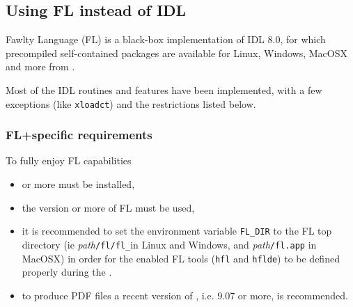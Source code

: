 \documentclass[12pt,twoside]{article}
\makeatletter
\newcommand{\nop}[1]{\Hy@raisedlink{\hypertarget{#1}{}}}
\newcommand{\mytarget}[1]{\nop{#1}}%
\newcommand{\mytarget}[1]{\label{#1}}
\makeatother
\begin{document}

\subsection{Using FL instead of IDL}
\label{install:using_fl}
\mytarget{install:using_fl}
Fawlty Language (FL) is a black-box implementation of IDL 8.0, for which precompiled self-contained packages
are available for Linux, Windows, MacOSX and more from 
\htmladdnormallink{\flsitea}{\flsitea}.

Most of the IDL routines and features have been implemented, with a few exceptions 
(like \texttt{xloadct}) and the restrictions listed below.

\subsubsection*{FL+\healpix specific requirements}
To fully enjoy FL capabilities
\begin{itemize}
\item \healpix \hpxversion{} or more must be installed,
%
\item the version \flversion or more of FL must be used,
%
\item it is recommended to set the environment variable \texttt{FL\_DIR} to the FL top directory (ie {\em path}\texttt{/fl/fl\_\flversion}in Linux and Windows, and {\em path}\texttt{/fl.app} in MacOSX) 
in order for the \healpix enabled FL tools (\texttt{hfl} and \texttt{hflde}) to be defined properly during the
.
%
\item to produce PDF files
a recent version of , i.e. 9.07 or more, is recommended.
%
\end{itemize}
\end{document}
